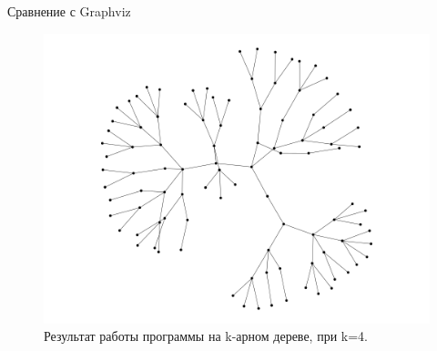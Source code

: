\documentclass{beamer}
\begin{document}
\begin{frame}{Сравнение с Graphviz}
\begin{figure}[H]
\begin{minipage}[t]{.32\textwidth}
			\caption*{алгоритм Камады-Кавай}
		\end{minipage}
		\begin{minipage}[t]{.32\textwidth}
			\centering
			\includegraphics[width=\linewidth]{./imgs/quad_tree_gv.png}
			\caption*{Graphviz}
		\end{minipage}
		\caption{Результат работы программы на k-арном дереве, при k=4.}
	\end{figure}
\end{frame}
\end{document}
